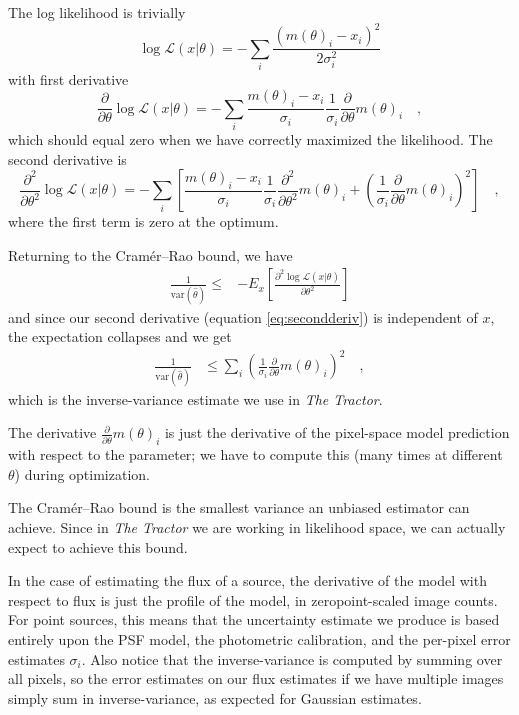 \documentclass[letterpaper]{article}
\newcommand{\likelihood}{\mathcal{L}}
\newcommand{\dd}{\partial}
\newcommand{\var}{\textrm{var}}
\begin{document}
The log likelihood is trivially
\begin{equation}
\log \likelihood(x | \theta) = -\sum_i \frac{(m(\theta)_i - x_i)^2}{2 \sigma_i^2}
\end{equation}
with first derivative
\begin{equation}
\frac{\dd}{\dd \theta} \log \likelihood(x | \theta) = - \sum_i \frac{m(\theta)_i - x_i}{\sigma_i} \frac{1}{\sigma_i} \frac{\dd}{\dd \theta} m(\theta)_i
\quad ,
\end{equation}
which should equal zero when we have correctly maximized the likelihood.
The second derivative is
\begin{equation}
\frac{\dd^2}{\dd \theta^2} \log \likelihood(x | \theta) = - \sum_i \left[
  \frac{m(\theta)_i - x_i}{\sigma_i} \frac{1}{\sigma_i} \frac{\dd^2}{\dd \theta^2} m(\theta)_i
  + \left( \frac{1}{\sigma_i} \frac{\dd}{\dd \theta} m(\theta)_i \right)^2
\right]
\quad ,
\end{equation}
where the first term is zero at the optimum.

Returning to the Cram\'er--Rao bound, we have
\begin{align}
\frac{1}{\var(\hat{\theta})} \le 
& - E_{x}\left[ \frac{\dd^2 \log \likelihood(x | \theta)}{\dd \theta^2} \right]
\label{eq:secondderiv}
\end{align}
and since our second derivative (equation \ref{eq:secondderiv}) is independent of $x$, the expectation
collapses and we get
\begin{align}
\frac{1}{\var(\hat{\theta})} & \le 
  \sum_i \left( \frac{1}{\sigma_i} \frac{\dd}{\dd \theta} m(\theta)_i \right)^2
  \quad ,
\end{align}
which is the inverse-variance estimate we use in \emph{The Tractor}.

The derivative $\displaystyle\frac{\dd}{\dd \theta} m(\theta)_i$ is just the
derivative of the pixel-space model prediction with respect to the
parameter; we have to compute this (many times at different $\theta$)
during optimization.

The Cram\'er--Rao bound is the smallest variance an unbiased estimator
can achieve.  Since in \emph{The Tractor} we are working in likelihood
space, we can actually expect to achieve this bound.

In the case of estimating the flux of a source, the derivative of the
model with respect to flux is just the profile of the model, in
zeropoint-scaled image counts.  For point sources, this means that the
uncertainty estimate we produce is based entirely upon the PSF model,
the photometric calibration, and the per-pixel error estimates
$\sigma_i$.  Also notice that the inverse-variance is computed by
summing over all pixels, so the error estimates on our flux estimates
if we have multiple images simply sum in inverse-variance, as expected
for Gaussian estimates.
\end{document}
